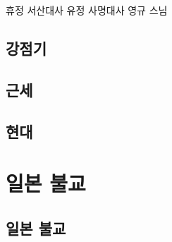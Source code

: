\documentclass[12pt, a4paper, oneside]{book}
\let\stdsection\section
\renewcommand\section{\newpage\stdsection}
\begin{document}
휴정 서산대사
유정 사명대사
영규 스님




%
	\section{ 강점기 }


%
	\section{ 근세 }


%
	\section{ 현대 }




	\chapter{ 일본 불교 }
	\noptcrule

	\newpage	
	\minitoc


%
	\section{ 일본 불교 }





\end{document}
